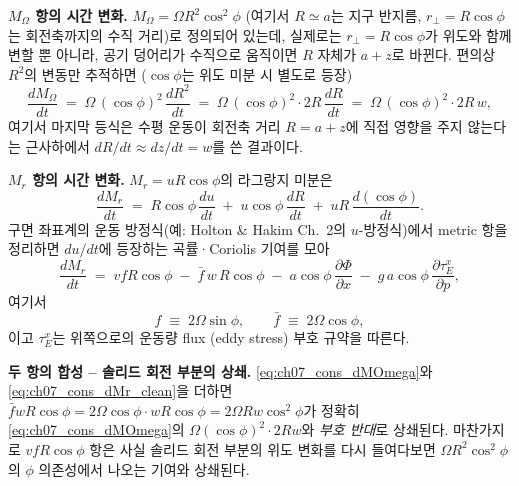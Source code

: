 \medskip



\noindent\textbf{$M_\Omega$ 항의 시간 변화.}
$M_\Omega = \Omega R^2\cos^2\phi$ (여기서 $R \simeq a$는 지구 반지름,
$r_\perp = R\cos\phi$는 회전축까지의 수직 거리)로 정의되어 있는데,
실제로는 $r_\perp = R\cos\phi$가 위도와 함께
변할 뿐 아니라, 공기 덩어리가 수직으로 움직이면 $R$ 자체가 $a+z$로 바뀐다.
편의상 $R^2$의 변동만 추적하면 ($\cos\phi$는 위도 미분 시 별도로 등장)
\begin{equation}\label{eq:ch07_cons_dMOmega}
  \frac{d M_\Omega}{dt}
  \;=\;
  \Omega\,(\cos\phi)^2 \,\frac{d R^2}{dt}
  \;=\;
  \Omega\,(\cos\phi)^2 \cdot 2 R\,\frac{dR}{dt}
  \;=\;
  \Omega\,(\cos\phi)^2 \cdot 2 R\,w,
\end{equation}
여기서 마지막 등식은 수평 운동이 회전축 거리 $R = a+z$에 직접 영향을 주지
않는다는 근사하에서 $dR/dt \approx dz/dt = w$를 쓴 결과이다.


\medskip



\noindent\textbf{$M_r$ 항의 시간 변화.}
$M_r = u R\cos\phi$의 라그랑지 미분은
\begin{equation}\label{eq:ch07_cons_dMr_raw}
  \frac{d M_r}{dt}
  \;=\;
  R\cos\phi\,\frac{d u}{dt}
  \;+\; u\cos\phi\,\frac{d R}{dt}
  \;+\; u R\,\frac{d(\cos\phi)}{dt}.
\end{equation}
구면 좌표계의 운동 방정식(예: Holton \& Hakim Ch.~2의 $u$-방정식)에서
metric 항을 정리하면 $du/dt$에 등장하는 곡률·Coriolis 기여를 모아
\begin{equation}\label{eq:ch07_cons_dMr_clean}
  \boxed{\;
  \frac{d M_r}{dt}
  \;=\;
  v f R\cos\phi
  \;-\;
  \bar f\, w\, R\cos\phi
  \;-\; a\cos\phi\,\frac{\partial \Phi}{\partial x}
  \;-\; g\,a\cos\phi\,\frac{\partial \tau_E^x}{\partial p},
  \;}
\end{equation}
여기서
\[
  f \;\equiv\; 2\Omega\sin\phi,
  \qquad
  \bar f \;\equiv\; 2\Omega\cos\phi,
\]
이고 $\tau_E^x$는 위쪽으로의 운동량 flux (eddy stress) 부호 규약을 따른다.


\medskip



\noindent\textbf{두 항의 합성 -- 솔리드 회전 부분의 상쇄.}
\eqref{eq:ch07_cons_dMOmega}와 \eqref{eq:ch07_cons_dMr_clean}을 더하면
$\bar f w R\cos\phi = 2\Omega\cos\phi \cdot w R\cos\phi = 2\Omega R w \cos^2\phi$가
정확히 \eqref{eq:ch07_cons_dMOmega}의 $\Omega(\cos\phi)^2\cdot 2Rw$와 \emph{부호
반대}로 상쇄된다.  마찬가지로 $vfR\cos\phi$ 항은 사실 솔리드 회전 부분의
위도 변화를 다시 들여다보면 $\Omega R^2 \cos^2\phi$의 $\phi$ 의존성에서 나오는
기여와 상쇄된다.

